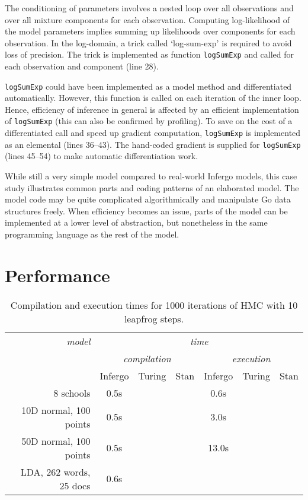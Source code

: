 \documentclass[sigplan,review,10pt,anonymous]{acmart}
\begin{document}
\begin{sloppypar}
The conditioning of parameters involves a nested loop over all
observations and over all mixture components for each
observation.  Computing log-likelihood of the model parameters
implies summing up likelihoods over components for each
observation.  In the log-domain, a trick called `log-sum-exp' is
required to avoid loss of precision. The trick is implemented
as function \lstinline{logSumExp} and called for each
observation and component (line 28).

\lstinline{logSumExp} could have been implemented as a model
method and differentiated automatically. However, this function
is called on each iteration of the inner loop. Hence,
efficiency of inference in general is affected by 
an efficient implementation of \lstinline{logSumExp} (this can
also be confirmed by profiling). To save on the cost of a
differentiated call and speed up gradient computation,
\lstinline{logSumExp} is implemented as an elemental (lines
36--43). The hand-coded gradient is supplied for
\lstinline{logSumExp} (lines 45--54) to make automatic
differentiation work.

While still a very simple model compared to real-world Infergo
models, this case study illustrates common parts and coding
patterns of an elaborated model. The model code may be quite
complicated algorithmically and manipulate Go data structures
freely. When efficiency becomes an issue, parts of the model
can be implemented at a lower level of abstraction, but
nonetheless in the same programming language as the rest of the
model.

\section{Performance}

\begin{table*}
\begin{tabular}{r | c |  c | c | c | c | c | }
	{\it model}  & \multicolumn{6}{c|}{\it time} \\
	& \multicolumn{3}{c|}{\it compilation} & \multicolumn{3}{c|}{\it execution} \\
	& Infergo & Turing & Stan & Infergo & Turing & Stan \\\hline
	8 schools              & 0.5s & & & 0.6s  & & \\
	10D normal, 100 points & 0.5s & & & 3.0s  & & \\
	50D normal, 100 points & 0.5s & & & 13.0s & & \\
	LDA, 262 words, 25 docs
	                       & 0.6s & & &       & & 
\end{tabular}
\caption{Compilation and execution times for 1000 iterations 
	of HMC with 10 leapfrog steps.}
\label{tab:memory-runtime}
\end{table*}


\end{sloppypar}
\end{document}
